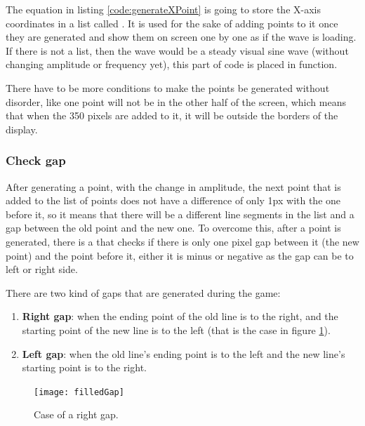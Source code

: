 The equation in listing \ref{code:generateXPoint} is going to store the X-axis coordinates in a list called . It is used for the sake of adding points to it once they are generated and show them on screen one by one as if the wave is loading. If there is not a list, then the wave would be a steady visual sine wave (without changing amplitude or frequency yet), this part of code is placed in  function.

There have to be more conditions to make the points be generated without disorder, like one point will not be in the other half of the screen, which means that when the 350 pixels are added to it, it will be outside the borders of the display.


\subsubsection{Check gap}
After generating a point, with the change in amplitude, the next point that is added to the list of points does not have a difference of only 1px with the one before it, so it means that there will be a different line segments in the list and a gap between the old point and the new one. To overcome this, after a point is generated, there is a  that checks if there is only one pixel gap between it (the new point) and the point before it, either it is minus or negative as the gap can be to left or right side.

There are two kind of gaps that are generated during the game:
\begin{enumerate}
	\item \textbf{Right gap}: when the ending point of the old line is to the right, and the starting point of the new line is to the left (that is the case in figure \ref{fig:rightGap}).
	\item \textbf{Left gap}: when the old line's ending point is to the left and the new line's starting point is to the right.
\end{enumerate}

\begin{figure}[H]
	\centering
	\texttt{[image: filledGap]}
	\caption{Case of a right gap.}
	\label{fig:rightGap}
\end{figure}

